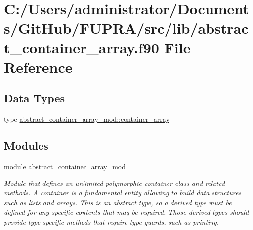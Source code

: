 \hypertarget{abstract__container__array_8f90}{}\section{C\+:/\+Users/administrator/\+Documents/\+Git\+Hub/\+F\+U\+P\+R\+A/src/lib/abstract\+\_\+container\+\_\+array.f90 File Reference}
\label{abstract__container__array_8f90}
\subsection*{Data Types}
\begin{DoxyCompactItemize}
\item 
type \mbox{\hyperlink{structabstract__container__array__mod_1_1container__array}{abstract\+\_\+container\+\_\+array\+\_\+mod\+::container\+\_\+array}}
\end{DoxyCompactItemize}
\subsection*{Modules}
\begin{DoxyCompactItemize}
\item 
module \mbox{\hyperlink{namespaceabstract__container__array__mod}{abstract\+\_\+container\+\_\+array\+\_\+mod}}
\begin{DoxyCompactList}\small\item\em Module that defines an unlimited polymorphic container class and related methods. A container is a fundamental entity allowing to build data structures such as lists and arrays. This is an abstract type, so a derived type must be defined for any specific contents that may be required. Those derived types should provide type-\/specific methods that require type-\/guards, such as printing. \end{DoxyCompactList}\end{DoxyCompactItemize}
